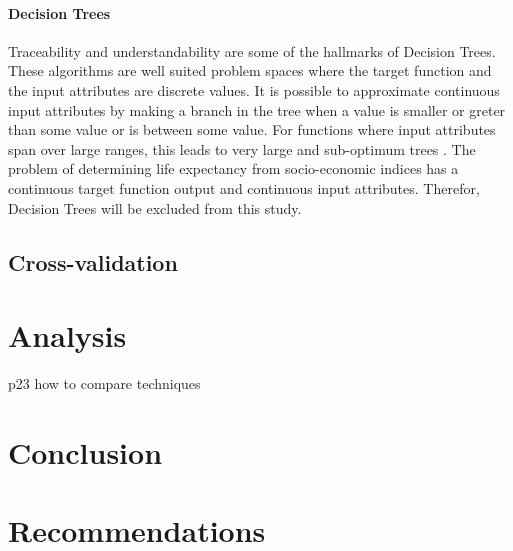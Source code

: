 \documentclass[12pt,a4paper]{article}
\begin{document}
\paragraph{Decision Trees}

Traceability and understandability are some of the hallmarks of Decision Trees. These algorithms are well suited problem spaces where the target function and the input attributes are discrete values. It is possible to approximate continuous input attributes by making a branch in the tree when a value is smaller or greter than some value or is between some value. For functions where input attributes span over large ranges, this leads to very large and sub-optimum trees \citep{Mitchell}. The problem of determining life expectancy from socio-economic indices has a continuous target function output and continuous input attributes. Therefor, Decision Trees will be excluded from this study.

\subsection{Cross-validation}

\section{Analysis}


\cite{Murphy} p23 how to compare techniques
\section{Conclusion}

\section{Recommendations}



\appendix
\appendixpage
\end{document}

